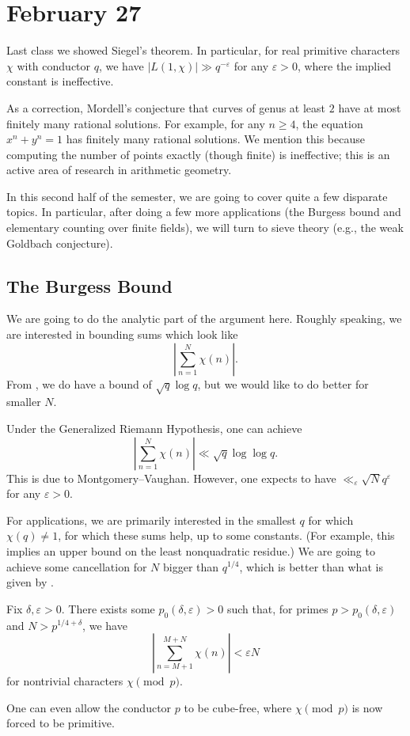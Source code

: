\documentclass[../notes.tex]{subfiles}
\begin{document}
\section{February 27}

Last class we showed Siegel's theorem. In particular, for real primitive characters $\chi$ with conductor $q$, we have $|L(1,\chi)|\gg q^{-\varepsilon}$ for any $\varepsilon>0$, where the implied constant is ineffective.
\begin{remark}
	As a correction, Mordell's conjecture that curves of genus at least $2$ have at most finitely many rational solutions. For example, for any $n\ge4$, the equation $x^n+y^n=1$ has finitely many rational solutions. We mention this because computing the number of points exactly (though finite) is ineffective; this is an active area of research in arithmetic geometry.
\end{remark}
In this second half of the semester, we are going to cover quite a few disparate topics. In particular, after doing a few more applications (the Burgess bound and elementary counting over finite fields), we will turn to sieve theory (e.g., the weak Goldbach conjecture).

\subsection{The Burgess Bound}
We are going to do the analytic part of the argument here. Roughly speaking, we are interested in bounding sums which look like
\[\left|\sum_{n=1}^{N}\chi(n)\right|.\]
From , we do have a bound of $\sqrt q\log q$, but we would like to do better for smaller $N$.
\begin{remark}
	Under the Generalized Riemann Hypothesis, one can achieve
	\[\left|\sum_{n=1}^{N}\chi(n)\right|\ll\sqrt q\log\log q.\]
	This is due to Montgomery--Vaughan. However, one expects to have $\ll_\varepsilon\sqrt Nq^\varepsilon$ for any $\varepsilon>0$.
\end{remark}
For applications, we are primarily interested in the smallest $q$ for which $\chi(q)\ne1$, for which these sums help, up to some constants. (For example, this implies an upper bound on the least nonquadratic residue.) We are going to achieve some cancellation for $N$ bigger than $q^{1/4}$, which is better than what is given by .
\begin{theorem}[Burgess] \label{thm:burgess}
	Fix $\delta,\varepsilon>0$. There exists some $p_0(\delta,\varepsilon)>0$ such that, for primes $p>p_0(\delta,\varepsilon)$ and $N>p^{1/4+\delta}$, we have
	\[\left|\sum_{n=M+1}^{M+N}\chi(n)\right|<\varepsilon N\]
	for nontrivial characters $\chi\pmod p$.
\end{theorem}
\begin{remark}
	One can even allow the conductor $p$ to be cube-free, where $\chi\pmod p$ is now forced to be primitive.
\end{remark}
\end{document}
